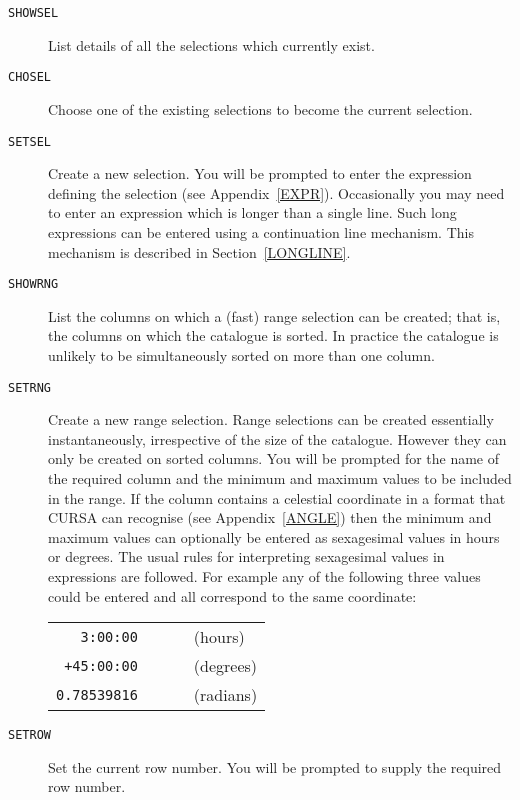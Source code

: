 \documentclass[twoside,11pt]{article}
\renewcommand{\_}{\texttt{\symbol{95}}}
\begin{document}
\begin{description}
  \item[ {\tt SHOWSEL} ] List details of all the selections which
   currently exist.

  \item[ {\tt CHOSEL} ] Choose one of the existing selections to become
   the current selection.

  \item[ {\tt SETSEL} ] Create a new selection.  You will be prompted to
   enter the expression defining the selection (see Appendix~\ref{EXPR}).
   Occasionally you may need to enter an expression which is longer than a
   single line.  Such long expressions can be entered using a continuation
   line mechanism.  This mechanism is described in Section~\ref{LONGLINE}.

  \item[ {\tt SHOWRNG} ] List the columns on which a (fast) range
   selection can be created; that is, the columns on which the
   catalogue is sorted. In practice the catalogue is unlikely to be
   simultaneously sorted on more than one column.

  \item[ {\tt SETRNG} ] Create a new range selection.  Range selections
   can be created essentially instantaneously, irrespective of the
   size of the catalogue.  However they can only be created on sorted
   columns.  You will be prompted for the name of the required column
   and the minimum and maximum values to be included in the range. If
   the column contains a celestial coordinate in a format that CURSA
   can recognise (see Appendix~\ref{ANGLE}) then the minimum and
   maximum values can optionally be entered as sexagesimal values in
   hours or degrees.  The usual rules for interpreting sexagesimal
   values in expressions are followed.  For example any of the following
   three values could be entered and all correspond to the same 
   coordinate:

  \begin{center}
  \begin{tabular}{rll}
   {\tt 3:00:00}    & ~~~ & (hours)   \\
   {\tt +45:00:00}  & ~~~ & (degrees) \\
   {\tt 0.78539816} & ~~~ & (radians) \\
  \end{tabular}
  \end{center}

  \item[ {\tt SETROW} ] Set the current row number. You will be prompted
   to supply the required row number.


\end{description}
\end{document}
